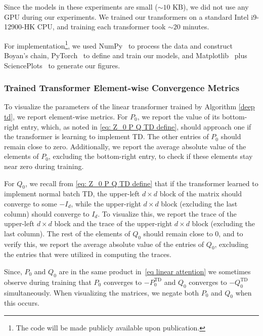 \documentclass{article}
\newcommand{\td}{\text{TD}}
\begin{document}
Since the models in these experiments are small ($\sim 10$ KB), we did not use any GPU during our experiments. We trained our transformers on a standard Intel i9-12900-HK CPU, and training each transformer took $\sim20$ minutes.

For implementation\footnote{The code will be made publicly available upon publication.}, we used NumPy~\citep{harris2020numpy} to process the data and construct Boyan's chain, PyTorch~\citep{ansel2024pytorch} to define and train our models, and Matplotlib~\citep{hunter2007matplotlib} plus SciencePlots~\citep{garrett2021SciencePlots} to generate our figures.

\subsubsection{Trained Transformer Element-wise Convergence Metrics} \label{appendix: element-wise metrics}
To visualize the parameters of the linear transformer trained by Algorithm \ref{deep td}, we report element-wise metrics. For $P_0$, we report the value of its bottom-right entry, which, as noted in \eqref{eq: Z_0 P Q TD define}, should approach one if the transformer is learning to implement TD. The other entries of $P_0$ should remain close to zero. Additionally, we report the average absolute value of the elements of $P_0$, excluding the bottom-right entry, to check if these elements stay near zero during training.

For $Q_0$, we recall from \eqref{eq: Z_0 P Q TD define} that if the transformer learned to implement normal batch TD, the upper-left $d\times d$ block of the matrix should converge to some $-I_d$, while the upper-right $d\times d$ block (excluding the last column) should converge to $I_d$. To visualize this, we report the trace of the upper-left $d\times d$ block and the trace of the upper-right $d\times d$ block (excluding the last column). The rest of the elements of $Q_0$ should remain close to 0, and to verify this, we report the average absolute value of the entries of $Q_0$, excluding the entries that were utilized in computing the traces. 

Since, $P_0$ and $Q_0$ are in the same product in~\eqref{eq linear attention} we sometimes observe during training that $P_0$ converges to $-P_0^{\td}$ and $Q_0$ converges to $-Q_0^{\td}$ simultaneously. When visualizing the matrices,  we negate both $P_0$ and $Q_0$ when this occurs.
\end{document}
